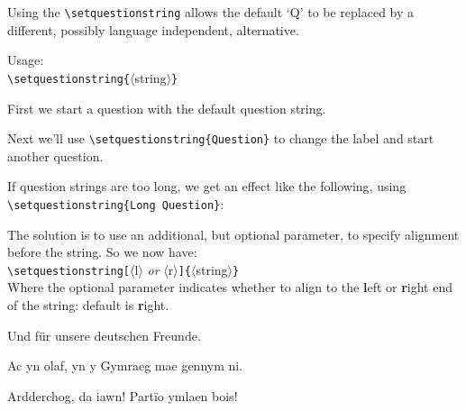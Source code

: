 \documentclass[a4paper,12pt]{article}
\begin{document}
Using the \verb|\setquestionstring| allows the default `Q' to be replaced by a different, possibly language independent, alternative.

Usage:\\
\verb|\setquestionstring{|$\langle$string$\rangle$\verb|}|

First we start a question with the default question string.

\begin{question}
\qpart
\lipsum[1][1]
\end{question}

Next we'll use \verb|\setquestionstring{Question}| to change the label and start another question.

\begin{question}
\qpart
\lipsum[1][1]
\end{question}

If question strings are too long, we get an effect like the following, using\\
\verb|\setquestionstring{Long Question}|:

\begin{question}
\qpart
\lipsum[1][1]
\end{question}

The solution is to use an additional, but optional parameter, to specify alignment before the string. So we now have:\\
\verb|\setquestionstring[|$\langle$l$\rangle$ \textit{or} $\langle$r$\rangle$\verb|]{|$\langle$string$\rangle$\verb|}|\\
Where the optional parameter indicates whether to align to the \textbf{l}eft or \textbf{r}ight end of the string: default is \textbf{r}ight.


\begin{question}
\qpart
\lipsum[1][1]
\end{question}

Und f\"ur unsere deutschen Freunde.


\begin{question}
\qpart
\lipsum[1][1]
\end{question}

Ac yn olaf, yn y Gymraeg mae gennym ni.


\begin{question}
\qpart
\lipsum[1][1]
\end{question}

Ardderchog, da iawn! Partïo ymlaen bois!
\end{document}
